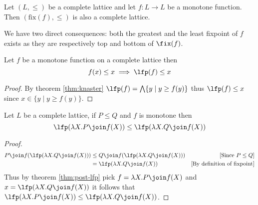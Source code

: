 \begin{theorem}
  \label{thm:knaster}
  Let $(L, \leq)$ be a complete lattice and let $f : L \to L$ be a monotone 
  function. Then $(\text{fix}(f), \leq)$ is also a complete lattice.
\end{theorem}

We have two direct consequences: both the greatest and the least fixpoint of
$f$ exists as they are respectively top and bottom of $\fix(f)$.

\begin{theorem}
  \label{thm:post-lfp}
  Let $f$ be a monotone function on a complete lattice then
  $$f(x) \leq x \implies \lfp(f) \leq x$$
\end{theorem}
\begin{proof}
  By theorem \ref{thm:knaster} $\lfp(f) = \bigwedge\{ y \mid y \geq f(y) \}$
  thus $\lfp(f) \leq x$ since $x \in \{ y \mid y \geq f(y) \}$.
\end{proof}

\begin{theorem}
  \label{thm:lfp-mono}
  Let $L$ be a complete lattice, if $P \leq Q$ and $f$ is monotone then
  $$\lfp(\lambda X. P \join f(X)) \leq \lfp(\lambda X. Q \join f(X))$$
\end{theorem}
\begin{proof}
  \begin{align*}
    P \join f(\lfp(\lambda X . Q \join f(X)))
      &\leq Q \join f(\lfp(\lambda X . Q \join f(X)))
      &\text{[Since $P \leq Q$]} \\
      &= \lfp(\lambda X . Q \join f(X))
      &\text{[By definition of fixpoint]} \\
  \end{align*}
  Thus by theorem \ref{thm:post-lfp} pick $f = \lambda X . P \join f(X)$ and
  $x = \lfp(\lambda X. Q \join f(X))$ it follows that
  $\lfp(\lambda X. P \join f(X)) \leq \lfp(\lambda X. Q \join f(X))$.
\end{proof}

